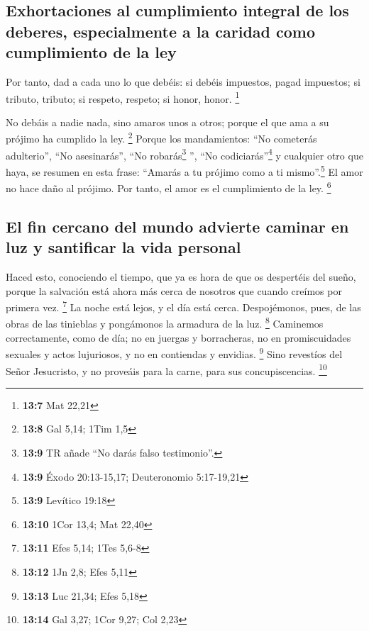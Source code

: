 \hypertarget{exhortaciones-al-cumplimiento-integral-de-los-deberes-especialmente-a-la-caridad-como-cumplimiento-de-la-ley}{%
\subsection{Exhortaciones al cumplimiento integral de los deberes,
especialmente a la caridad como cumplimiento de la
ley}\label{exhortaciones-al-cumplimiento-integral-de-los-deberes-especialmente-a-la-caridad-como-cumplimiento-de-la-ley}}

 Por tanto, dad a cada uno lo que debéis: si debéis
impuestos, pagad impuestos; si tributo, tributo; si respeto, respeto; si
honor, honor. \footnote{\textbf{13:7} Mat 22,21}

 No debáis a nadie nada, sino amaros unos a otros; porque
el que ama a su prójimo ha cumplido la ley. \footnote{\textbf{13:8} Gal
  5,14; 1Tim 1,5}  Porque los mandamientos: ``No cometerás
adulterio'', ``No asesinarás'', ``No robarás\footnote{\textbf{13:9} TR
  añade ``No darás falso testimonio''.} '', ``No codiciarás''\footnote{\textbf{13:9}
  Éxodo 20:13-15,17; Deuteronomio 5:17-19,21} y cualquier otro que haya,
se resumen en esta frase: ``Amarás a tu prójimo como a ti
mismo''.\footnote{\textbf{13:9} Levítico 19:18}  El amor
no hace daño al prójimo. Por tanto, el amor es el cumplimiento de la
ley. \footnote{\textbf{13:10} 1Cor 13,4; Mat 22,40}

\hypertarget{el-fin-cercano-del-mundo-advierte-caminar-en-luz-y-santificar-la-vida-personal}{%
\subsection{El fin cercano del mundo advierte caminar en luz y
santificar la vida
personal}\label{el-fin-cercano-del-mundo-advierte-caminar-en-luz-y-santificar-la-vida-personal}}

 Haced esto, conociendo el tiempo, que ya es hora de que
os despertéis del sueño, porque la salvación está ahora más cerca de
nosotros que cuando creímos por primera vez. \footnote{\textbf{13:11}
  Efes 5,14; 1Tes 5,6-8}  La noche está lejos, y el día
está cerca. Despojémonos, pues, de las obras de las tinieblas y
pongámonos la armadura de la luz. \footnote{\textbf{13:12} 1Jn 2,8; Efes
  5,11}  Caminemos correctamente, como de día; no en
juergas y borracheras, no en promiscuidades sexuales y actos lujuriosos,
y no en contiendas y envidias. \footnote{\textbf{13:13} Luc 21,34; Efes
  5,18}  Sino revestíos del Señor Jesucristo, y no
proveáis para la carne, para sus concupiscencias. \footnote{\textbf{13:14}
  Gal 3,27; 1Cor 9,27; Col 2,23}

